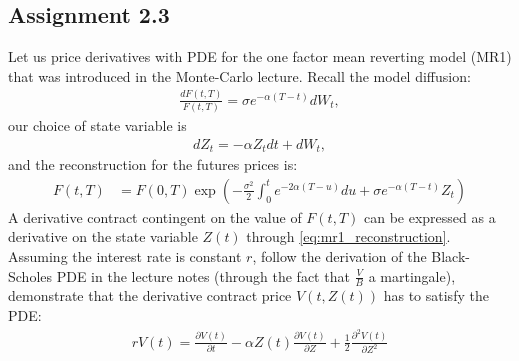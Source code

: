 \documentclass[11pt,a4paper,hidelinks,fleqn]{article}            %
\begin{document}
\subsection*{Assignment 2.3}
Let us price derivatives with PDE for the one factor mean reverting model (MR1) that was introduced in the Monte-Carlo lecture. 
Recall the model diffusion:
\begin{align*}
\frac{dF(t, T)}{F(t, T)} = \sigma e^{-\alpha (T- t)} dW_t,
\end{align*}
our choice of state variable is
\begin{align}
dZ_t = -\alpha Z_t dt + dW_t,
\end{align}
and the reconstruction for the futures prices is:
\begin{align}
F(t, T) & = F(0, T) \exp\left( -\frac{\sigma^2}{2} \int_0^t e^{-2\alpha (T - u)} du + \sigma e^{-\alpha(T-t)} Z_t \right)
\label{eq:mr1_reconstruction}
\end{align}
A derivative contract contingent on the value of $F(t, T)$ can be expressed as a derivative on the state variable $Z(t)$ through \eqref{eq:mr1_reconstruction}.
Assuming the interest rate is constant $r$,
follow the derivation of the Black-Scholes PDE in the lecture notes (through the fact that $\frac{V}{B}$ a martingale),
demonstrate that the derivative contract price $V(t, Z(t))$ has to satisfy the PDE:
\begin{align}
rV(t) = \frac{\partial V(t)}{\partial t} - \alpha Z(t) \frac{\partial V(t)}{\partial Z} + \frac{1}{2} \frac{\partial^2 V(t)}{\partial Z^2}
\end{align}
\end{document}
